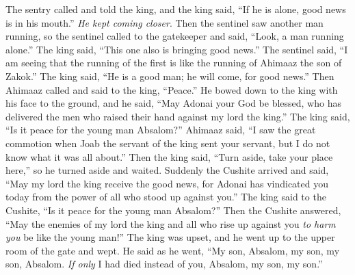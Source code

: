 \begin{biblechapter}
\verse The sentry called and told the king, and the king said, “If he is alone, good news is in his mouth.” \textit{He kept coming closer}.
\verse Then the sentinel saw another man running, so the sentinel called to the gatekeeper and said, “Look, a man running alone.” The king said, “This one also is bringing good news.”
\verse The sentinel said, “I am seeing that the running of the first is like the running of Ahimaaz the son of Zakok.” The king said, “He is a good man; he will come, for good news.”
\verse Then Ahimaaz called and said to the king, “Peace.” He bowed down to the king with his face to the ground, and he said, “May Adonai your God be blessed, who has delivered the men who raised their hand against my lord the king.”
\verse The king said, “Is it peace for the young man Absalom?” Ahimaaz said, “I saw the great commotion when Joab the servant of the king sent your servant, but I do not know what it was all about.”
\verse Then the king said, “Turn aside, take your place here,” so he turned aside and waited.
\verse Suddenly the Cushite arrived and said, “May my lord the king receive the good news, for Adonai has vindicated you today from the power of all who stood up against you.”
\verse The king said to the Cushite, “Is it peace for the young man Absalom?” Then the Cushite answered, “May the enemies of my lord the king and all who rise up against you \textit{to harm you} be like the young man!”
\verse {} The king was upset, and he went up to the upper room of the gate and wept. He said as he went, “My son, Absalom, my son, my son, Absalom. \textit{If only} I had died instead of you, Absalom, my son, my son.”
\end{biblechapter}

